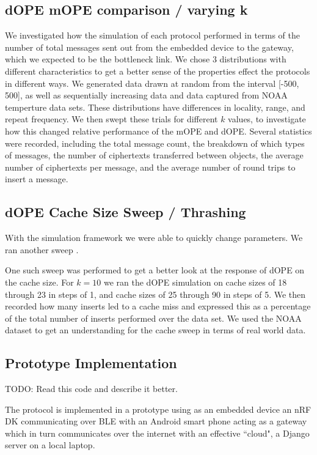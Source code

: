 \documentclass[12pt]{article}
\begin{document}
\subsection{dOPE mOPE comparison / varying k}
We investigated how the simulation of each protocol performed in terms of the number of total messages sent out from the embedded device to the gateway, which we expected to be the bottleneck link.  We chose 3 distributions with different characteristics to get a better sense of the properties effect the protocols in different ways.  We generated data drawn at random from the interval [-500, 500], as well as sequentially increasing data and data captured from NOAA temperture data sets.  These distributions have differences in locality, range, and repeat frequency.  We then swept these trials for different $k$ values, to investigate how this changed relative performance of the mOPE and dOPE.  Several statistics were recorded, including the total message count, the breakdown of which types of messages, the number of ciphertexts transferred between objects, the average number of ciphertexts per message, and the average number of round trips to insert a message.

\subsection{dOPE Cache Size Sweep / Thrashing}
With the simulation framework we were able to quickly change parameters.  We ran another sweep .  

One such sweep was performed to get a better look at the response of dOPE on the cache size.  For $k=10$ we ran the dOPE simulation on cache sizes of 18 through 23 in steps of 1, and cache sizes of 25 through 90 in steps of 5.  We then recorded how many inserts led to a cache miss and expressed this as a percentage of the total number of inserts performed over the data set.  We used the NOAA dataset to get an understanding for the cache sweep in terms of real world data.

 
\subsection{Prototype Implementation}
TODO: Read this code and describe it better. 

The protocol is implemented in a prototype using as an embedded device an nRF DK communicating over BLE with an Android smart phone acting as a gateway which in turn communicates over the internet with an effective ``cloud", a Django server on a local laptop.  
\end{document}
